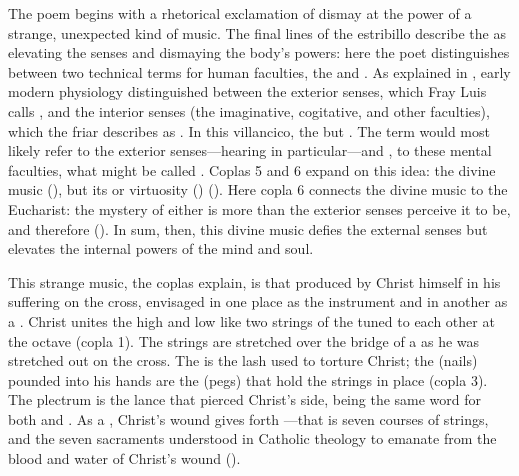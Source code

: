 The poem begins with a rhetorical exclamation of dismay at the power of a
strange, unexpected kind of music.
The final lines of the estribillo describe the  as
elevating the senses and dismaying the body's powers: here the poet
distinguishes between two technical terms for human faculties, the
 and .
As explained in , early modern physiology distinguished
between the exterior senses, which Fray Luis calls , and the interior senses (the imaginative, cogitative, and other
faculties), which the friar describes as .
In this villancico, the   but
.  
The term  would most likely refer to the exterior
senses---hearing in particular---and , to these mental
faculties, what might be called .
Coplas 5 and 6 expand on this idea: the divine music  (), but its  or virtuosity
() 
().
Here copla 6 connects the divine music to the Eucharist: the mystery of either
is more than the exterior senses perceive it to be, and therefore
().
In sum, then, this divine music defies the external senses but elevates the
internal powers of the mind and soul.

    
This strange music, the coplas explain, is that produced by Christ himself in
his suffering on the cross, envisaged in one place as the instrument
 and in another as a .
Christ unites the high and low like two strings of the  tuned to
each other at the octave (copla 1).  
The strings are stretched over the bridge of a  as he was
stretched out on the cross.
The  is the lash used to torture Christ; the 
(nails) pounded into his hands are the  (pegs) that hold the
strings in place (copla 3).
The plectrum is the lance that pierced Christ's side,  being the
same word for both  and .
As a , Christ's wound gives forth ---that is
seven courses of strings, and the seven sacraments understood in Catholic
theology to emanate from the blood and water of Christ's wound ().

